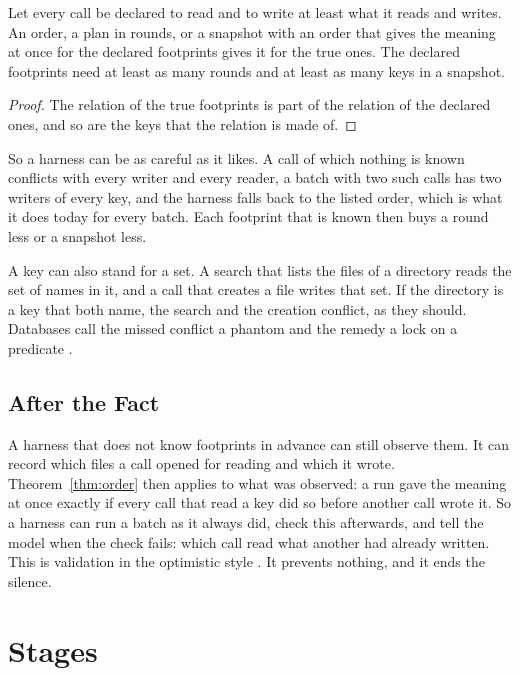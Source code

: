 \documentclass[acmsmall,nonacm,screen]{acmart}
\begin{document}
\begin{proposition}\label{prop:wider}
Let every call be declared to read and to write at least what it reads and writes. An
order, a plan in rounds, or a snapshot with an order that gives the meaning at once for the
declared footprints gives it for the true ones. The declared footprints need at least as
many rounds and at least as many keys in a snapshot.
\end{proposition}

\begin{proof}
The relation of the true footprints is part of the relation of the declared ones, and so are
the keys that the relation is made of.
\end{proof}

So a harness can be as careful as it likes. A call of which nothing is known conflicts with
every writer and every reader, a batch with two such calls has two writers of every key, and
the harness falls back to the listed order, which is what it does today for every batch.
Each footprint that is known then buys a round less or a snapshot less.

A key can also stand for a set. A search that lists the files of a directory reads the set
of names in it, and a call that creates a file writes that set. If the directory is a key
that both name, the search and the creation conflict, as they should. Databases call the
missed conflict a phantom and the remedy a lock on a predicate \citep{Eswaran1976}.

\subsection{After the Fact}

A harness that does not know footprints in advance can still observe them. It can record
which files a call opened for reading and which it wrote. Theorem~\ref{thm:order} then
applies to what was observed: a run gave the meaning at once exactly if every call that read
a key did so before another call wrote it. So a harness can run a batch as it always did,
check this afterwards, and tell the model when the check fails: which call read what
another had already written. This is validation in the optimistic style
\citep{KungRobinson1981}. It prevents nothing, and it ends the silence.

\section{Stages}\label{sec:stages}
\end{document}
